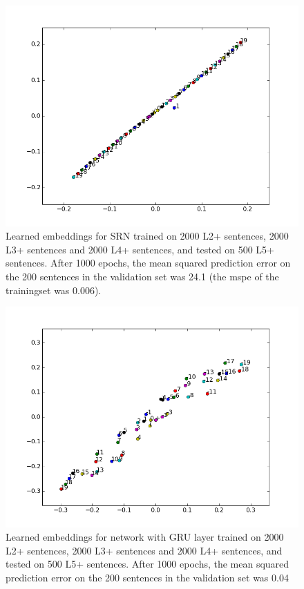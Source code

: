 \documentclass{article}
\begin{document}
\begin{figure}[!ht]
        \includegraphics[scale=0.8]{SRN_L2L3L4.png}
        \caption{Learned embeddings for SRN trained on 2000 L2+ sentences, 2000 L3+ sentences and 2000 L4+ sentences, and tested on 500 L5+ sentences. After 1000 epochs, the mean squared prediction error on the 200 sentences in the validation set was 24.1 (the mspe of the trainingset was 0.006).}\label{fig:SRN_L2L3L4_testL5}
\end{figure}

\begin{figure}[!ht]
        \includegraphics[scale=0.8]{GRU_L2L3L4.png}
        \caption{Learned embeddings for network with GRU layer trained on 2000 L2+ sentences, 2000 L3+ sentences and 2000 L4+ sentences, and tested on 500 L5+ sentences. After 1000 epochs, the mean squared prediction error on the 200 sentences in the validation set was 0.04}\label{fig:GRU_L2L3L4}
\end{figure}
\end{document}
